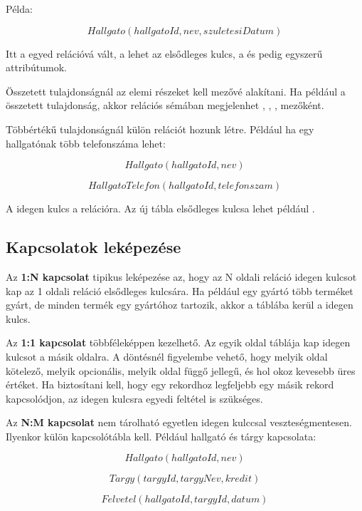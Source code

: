 Példa:

\[
  Hallgato(hallgatoId, nev, szuletesiDatum)
\]

Itt a  egyed relációvá vált, a  lehet az elsődleges kulcs, a  és  pedig egyszerű attribútumok.

Összetett tulajdonságnál az elemi részeket kell mezővé alakítani. Ha például a  összetett tulajdonság, akkor relációs sémában megjelenhet , , ,  mezőként.

Többértékű tulajdonságnál külön relációt hozunk létre. Például ha egy hallgatónak több telefonszáma lehet:

\[
  Hallgato(hallgatoId, nev)
\]

\[
  HallgatoTelefon(hallgatoId, telefonszam)
\]

A  idegen kulcs a  relációra. Az új tábla elsődleges kulcsa lehet például .

\subsection{Kapcsolatok leképezése}

Az \textbf{1:N kapcsolat} tipikus leképezése az, hogy az N oldali reláció idegen kulcsot kap az 1 oldali reláció elsődleges kulcsára. Ha például egy gyártó több terméket gyárt, de minden termék egy gyártóhoz tartozik, akkor a  táblába kerül a  idegen kulcs.



Az \textbf{1:1 kapcsolat} többféleképpen kezelhető. Az egyik oldal táblája kap idegen kulcsot a másik oldalra. A döntésnél figyelembe vehető, hogy melyik oldal kötelező, melyik opcionális, melyik oldal függő jellegű, és hol okoz kevesebb üres értéket. Ha biztosítani kell, hogy egy rekordhoz legfeljebb egy másik rekord kapcsolódjon, az idegen kulcsra egyedi feltétel is szükséges.

Az \textbf{N:M kapcsolat} nem tárolható egyetlen idegen kulccsal veszteségmentesen. Ilyenkor külön kapcsolótábla kell. Például hallgató és tárgy kapcsolata:

\[
  Hallgato(hallgatoId, nev)
\]

\[
  Targy(targyId, targyNev, kredit)
\]

\[
  Felvetel(hallgatoId, targyId, datum)
\]

